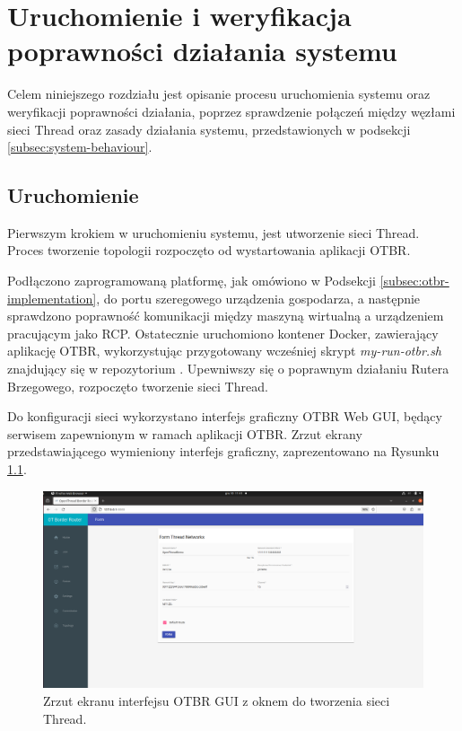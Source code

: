 \chapter{Uruchomienie i weryfikacja poprawności działania systemu}

Celem niniejszego rozdziału jest opisanie procesu uruchomienia systemu oraz weryfikacji poprawności działania, poprzez sprawdzenie połączeń między węzłami sieci Thread oraz zasady działania systemu, przedstawionych w podsekcji \ref{subsec:system-behaviour}.

\section{Uruchomienie}

Pierwszym krokiem w uruchomieniu systemu, jest utworzenie sieci Thread. Proces tworzenie topologii rozpoczęto od wystartowania aplikacji OTBR.

Podłączono zaprogramowaną platformę, jak omówiono w Podsekcji \ref{subsec:otbr-implementation}, do portu szeregowego urządzenia gospodarza, a następnie sprawdzono poprawność komunikacji między maszyną wirtualną a urządzeniem pracującym jako RCP. Ostatecznie uruchomiono kontener Docker, zawierający aplikację OTBR, wykorzystując przygotowany wcześniej skrypt \textit{my-run-otbr.sh} znajdujący się w repozytorium \cite{project-repo}. Upewniwszy się o poprawnym działaniu Rutera Brzegowego, rozpoczęto tworzenie sieci Thread.
    
Do konfiguracji sieci wykorzystano interfejs graficzny OTBR Web GUI, będący serwisem zapewnionym w ramach aplikacji OTBR. Zrzut ekrany przedstawiającego wymieniony interfejs graficzny, zaprezentowano na Rysunku \ref{fig:otbr-web-gui}.

\begin{figure}[H]
    \centering
    \includegraphics[width=0.8\linewidth]{graphics/screenshots/OTBR-web-gui.png}
    \caption{Zrzut ekranu interfejsu OTBR GUI z oknem do tworzenia sieci Thread.}
    \label{fig:otbr-web-gui}
\end{figure}

